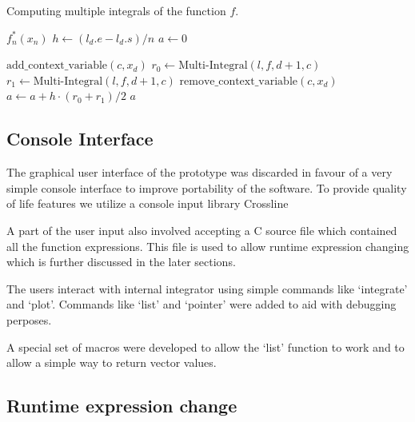 \documentclass[12pt]{article}
\begin{document}
\begin{algorithm}
	\caption{Computing multiple integrals of the function $f$.}
	\begin{algorithmic}[1]
		\State \Return $f^*_n(x_n)$ 
		\Else
		\State $h \gets (l_d.e - l_d.s) / n$
		\State $a \gets 0$

		\State $\text{add\_context\_variable}\left( c, x_d \right)$
		\State $r_0 \gets \text{Multi-Integral}(l, f, d + 1, c)$
		\State $r_1 \gets \text{Multi-Integral}(l, f, d + 1, c)$
		\State $\text{remove\_context\_variable}\left( c, x_d \right)$
		\State $a \gets a + h \cdot (r_0 + r_1) / 2$
		\EndFor
		\State \Return $a$
		\EndIf
		\EndProcedure
	\end{algorithmic}
\end{algorithm}

\subsection{Console Interface}

The graphical user interface of the prototype was discarded in favour of a very simple console interface to improve portability of
the software. To provide quality of life features we utilize a console input library Crossline\cite{ac}

A part of the user input also involved accepting a C source file which contained all the function expressions. This file is used to allow runtime
expression changing which is further discussed in the later sections.

The users interact with internal integrator using simple commands like `integrate' and `plot'. Commands like `list' and `pointer' were added to 
aid with debugging perposes.

A special set of macros were developed to allow the `list' function to work and to allow a simple way to return vector values.

\subsection{Runtime expression change}
\end{document}
